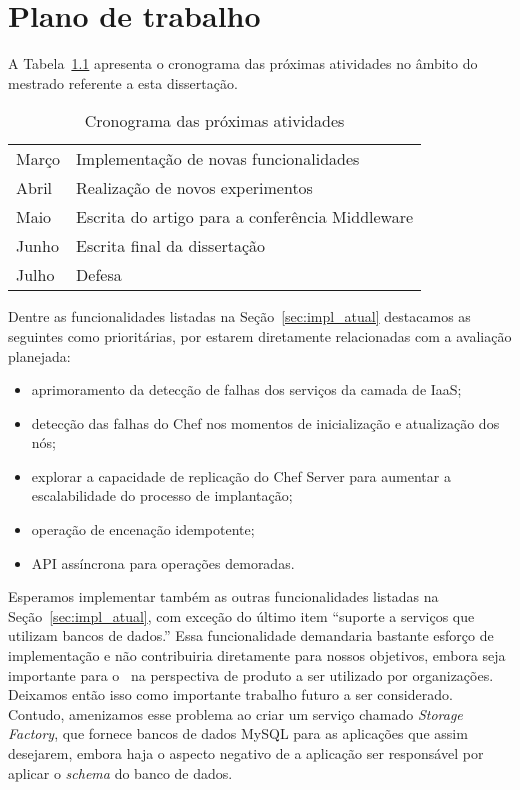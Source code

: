 \chapter{Plano de trabalho}
\label{cap:cronograma}

A Tabela~\ref{tab:cronograma} apresenta o cronograma das próximas atividades no âmbito do mestrado referente a esta dissertação.

\begin{table}[!ht]
\begin{center}
    \begin{tabular}{l l}
	 \hline
Março & Implementação de novas funcionalidades \\
Abril & Realização de novos experimentos \\
Maio & Escrita do artigo para a conferência Middleware \\
Junho & Escrita final da dissertação \\
Julho & Defesa \\
	 \hline
    \end{tabular}
  \caption{Cronograma das próximas atividades}
  \label{tab:cronograma}
\end{center}
\end{table}

Dentre as funcionalidades listadas na Seção~\ref{sec:impl_atual} destacamos as seguintes como prioritárias, por estarem diretamente relacionadas com a avaliação planejada:

\begin{itemize}
\item aprimoramento da detecção de falhas dos serviços da camada de IaaS;
\item detecção das falhas do Chef nos momentos de inicialização e atualização dos nós;
\item explorar a capacidade de replicação do Chef Server para aumentar a escalabilidade do processo de implantação;
\item operação de encenação idempotente;
\item API assíncrona para operações demoradas.
\end{itemize}

Esperamos implementar também as outras funcionalidades listadas na Seção~\ref{sec:impl_atual}, com exceção do último item ``suporte a serviços que utilizam bancos de dados.'' Essa funcionalidade demandaria bastante esforço de implementação e não contribuiria diretamente para nossos objetivos, embora seja importante para o \ee\ na perspectiva de produto a ser utilizado por organizações. Deixamos então isso como importante trabalho futuro a ser considerado. Contudo, amenizamos esse problema ao criar um serviço chamado \emph{Storage Factory}, que fornece bancos de dados MySQL para as aplicações que assim desejarem, embora haja o aspecto negativo de a aplicação ser responsável por aplicar o \emph{schema} do banco de dados.

